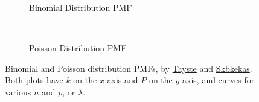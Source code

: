 \begin{figure}
  \centering

  \begin{subfigure}[b]{\wd\largestimage}\centering
  \caption{Binomial Distribution PMF}
  \label{fig:dist:binomial}
  \end{subfigure}
  ~
  \begin{subfigure}[b]{0.48\textwidth}\centering
    \usebox{\largestimage}
  \caption{Poisson Distribution PMF}
  \label{fig:dist:poisson}
  \end{subfigure}
\caption{
Binomial and Poisson distribution PMFs,
by \href{https://en.wikipedia.org/wiki/File:Binomial_distribution_pmf.svg}{Tayste}
and \href{https://en.wikipedia.org/wiki/File:Poisson_pmf.svg}{Skbkekas}.
Both plots have $k$ on the $x$-axis and $P$ on the $y$-axis, and curves for various $n$ and $p$, or $\lambda$.
\label{fig:dist:binomial_poisson}
}
\end{figure}


